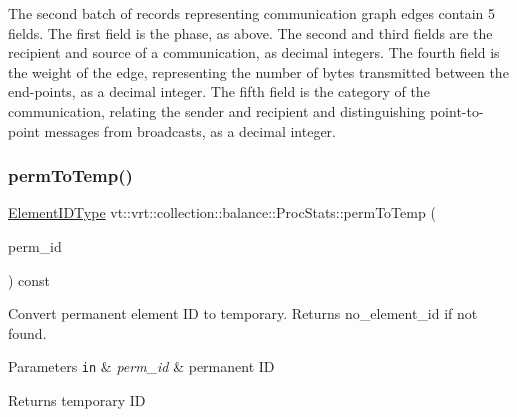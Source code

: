 The second batch of records representing communication graph edges contain 5 fields. The first field is the phase, as above. The second and third fields are the recipient and source of a communication, as decimal integers. The fourth field is the weight of the edge, representing the number of bytes transmitted between the end-\/points, as a decimal integer. The fifth field is the category of the communication, relating the sender and recipient and distinguishing point-\/to-\/point messages from broadcasts, as a decimal integer. \mbox{\label{structvt_1_1vrt_1_1collection_1_1balance_1_1_proc_stats_a5b3d280cadc1a2d06de37b5d2da41ba8}} 
\subsubsection{\texorpdfstring{perm\+To\+Temp()}{permToTemp()}}
{\footnotesize\ttfamily \hyperlink{namespacevt_1_1vrt_1_1collection_1_1balance_a14c8d2c972f2913aa3f1636e5be0a120}{Element\+I\+D\+Type} vt\+::vrt\+::collection\+::balance\+::\+Proc\+Stats\+::perm\+To\+Temp (\begin{DoxyParamCaption}\item[{\hyperlink{namespacevt_1_1vrt_1_1collection_1_1balance_a14c8d2c972f2913aa3f1636e5be0a120}{Element\+I\+D\+Type}}]{perm\+\_\+id }\end{DoxyParamCaption}) const}



Convert permanent element ID to temporary. Returns {\ttfamily no\+\_\+element\+\_\+id} if not found. 


\begin{DoxyParams}[1]{Parameters}
\mbox{\tt in}  & {\em perm\+\_\+id} & permanent ID\\
\hline
\end{DoxyParams}
\begin{DoxyReturn}{Returns}
temporary ID 
\end{DoxyReturn}
\mbox{\label{structvt_1_1vrt_1_1collection_1_1balance_1_1_proc_stats_a7865efba4c984b1b77a93b5cd04dc861}} 
